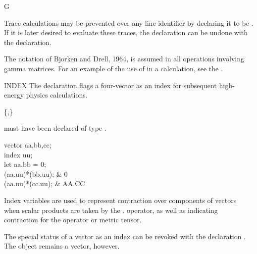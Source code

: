 \begin{Operator}{G}
\begin{Comments}
Trace calculations may be prevented over any line identifier by declaring it
to be .   If it is later desired to evaluate these traces,
the declaration can be undone with the  declaration.

The notation of Bjorken and Drell, 
1964, is assumed in all operations involving gamma matrices.  For an
example of the use of  in a calculation, see the .
\end{Comments}
\end{Operator}


\begin{Declaration}{INDEX}
The declaration  flags a four-vector as an index for subsequent
high-energy physics calculations.
\begin{Syntax}
 \{,\}\optional
\end{Syntax}

 must have been declared of type .

\begin{Examples}
vector aa,bb,cc; \\
index uu; \\
let aa.bb = 0; \\
(aa.uu)*(bb.uu);                  &      0 \\
(aa.uu)*(cc.uu);                  &      AA.CC
\end{Examples}

\begin{Comments}
Index variables are used to represent contraction over components of
vectors when scalar products are taken by the . operator, as well as
indicating contraction for the  operator or metric tensor.

The special status of a vector as an index can be revoked with the
declaration .  The object remains a vector, however.
\end{Comments}
\end{Declaration}


